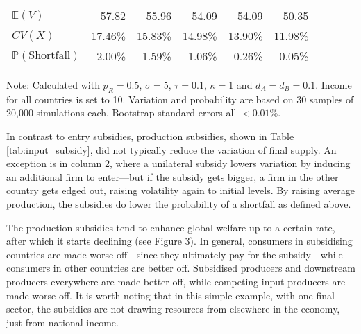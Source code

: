 \documentclass{article}
\begin{document}
\begin{table}
\begin{threeparttable}
\begin{tabular}{lrrrrr}
            $\mathbb{E}(V)$ & 57.82 & 55.96 & 54.09 & 54.09 & 50.35 \\
            $CV(X)$ & 17.46\% & 15.83\% & 14.98\% & 13.90\% & 11.98\% \\
            $\mathbb{P}(\text{Shortfall})$ & 2.00\% & 1.59\% & 1.06\% & 0.26\% & 0.05\% \\ 
            \bottomrule
        \end{tabular}
        \begin{tablenotes}
            \small \item Note: Calculated with $p_R = 0.5$, $\sigma = 5$, $\tau = 0.1$, $\kappa = 1$ and $d_A = d_B = 0.1$. Income for all countries is set to 10. Variation and probability are based on 30 samples of 20,000 simulations each. Bootstrap standard errors all $<0.01\%$.
        \end{tablenotes}
    \end{threeparttable}
\end{table}

In contrast to entry subsidies, production subsidies, shown in Table \ref{tab:input_subsidy}, did not typically reduce the variation of final supply. An exception is in column 2, where a unilateral subsidy lowers variation by inducing an additional firm to enter---but if the subsidy gets bigger, a firm in the other country gets edged out, raising volatility again to initial levels. By raising average production, the subsidies do lower the probability of a shortfall as defined above. 

The production subsidies tend to enhance global welfare up to a certain rate, after which it starts declining (see Figure 3). In general, consumers in subsidising countries are made worse off---since they ultimately pay for the subsidy---while consumers in other countries are better off. Subsidised producers and downstream producers everywhere are made better off, while competing input producers are made worse off. It is worth noting that in this simple example, with one final sector, the subsidies are not drawing resources from elsewhere in the economy, just from national income.
\end{document}
